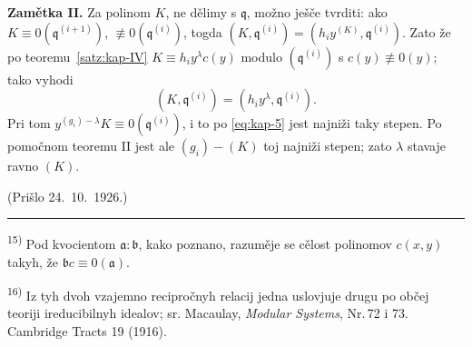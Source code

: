 \documentclass[11pt]{article}
\newcommand{\foreign}[1]{#1}
\theoremstyle{plain}
\begin{document}
\textbf{Zamětka II.} Za polinom $K$, ne dělimy s $\mathfrak{q}$,
možno ješče tvrditi: ako
$K \equiv 0(\mathfrak{q}^{(i+1)})$,
$\not\equiv 0(\mathfrak{q}^{(i)})$, togda
$(K, \mathfrak{q}^{(i)}) = (h_{i}y^{(K)}, \mathfrak{q}^{(i)})$.
Zato že po teoremu~\ref{satz:kap-IV}
$K \equiv h_{i}y^{\lambda}c(y)$ modulo
$(\mathfrak{q}^{(i)})$ s $c(y) \not\equiv 0(y)$; tako vyhodi
\[
(K, \mathfrak{q}^{(i)}) = (h_{i}y^{\lambda}, \mathfrak{q}^{(i)}).
\]
Pri tom $y^{(g_i)-\lambda}K\equiv0(\mathfrak{q}^{(i)})$,
i to po \eqref{eq:kap-5} jest najniži taky stepen. Po pomočnom
teoremu II jest ale $(g_{i}) - (K)$ toj najniži stepen; zato
$\lambda$ stavaje ravno $(K)$.

\vfill
\begin{flushright}
(Prišlo 24.\ 10.\ 1926.)
\end{flushright}

\vspace{0.5em}
\noindent\rule{\textwidth}{0.4pt}
\vspace{0.3em}

{\footnotesize
\textsuperscript{15)} Pod kvocientom $\mathfrak{a}:\mathfrak{b}$, kako poznano,
razuměje se cělost polinomov $c(x,y)$ takyh, že
$\mathfrak{b}c \equiv 0(\mathfrak{a})$.

\textsuperscript{16)} Iz tyh dvoh vzajemno recipročnyh relacij jedna uslovjuje
drugu po občej teoriji ireducibilnyh idealov; sr. Macaulay,
\textit{\foreign{Modular Systems}}, Nr.\,72 i 73. \foreign{Cambridge Tracts} 19 (1916).
}
\end{document}
